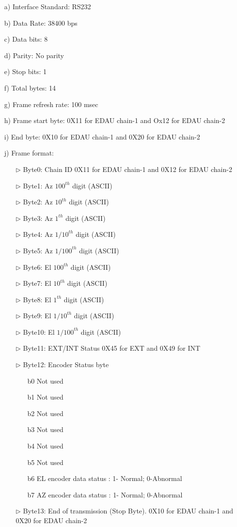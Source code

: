 \begin{enumerate}
	\item [a)] Interface Standard: RS232
	\item [b)] Data Rate:   38400 bps
	\item [c)] Data bits: 8
	\item [d)] Parity: No parity
	\item [e)] Stop bits: 1
	\item [f)] Total bytes: 14
	\item [g)] Frame refresh rate: 100 msec
	\item [h)] Frame start byte: 0X11 for EDAU chain-1 and Ox12 for EDAU chain-2
	\item [i)] End byte: 0X10 for EDAU chain-1 and 0X20 for EDAU chain-2
	\item [j)] Frame format: 
	\begin{enumerate}
		\item [$\rhd$] Byte0: Chain ID 0X11 for EDAU chain-1 and 0X12 for EDAU chain-2
		\item [$\rhd$] Byte1: Az ${100}^{th}$ digit (ASCII)
		\item [$\rhd$] Byte2: Az ${10}^{th}$ digit (ASCII)
		\item [$\rhd$] Byte3: Az ${1}^{th}$ digit (ASCII)
		\item [$\rhd$] Byte4: Az ${1/10}^{th}$ digit (ASCII)
		\item [$\rhd$] Byte5: Az ${1/100}^{th}$ digit (ASCII)
		\item [$\rhd$] Byte6: El ${100}^{th}$ digit (ASCII)
		\item [$\rhd$] Byte7: El ${10}^{th}$ digit (ASCII)
		\item [$\rhd$] Byte8: El ${1}^{th}$ digit (ASCII)
		\item [$\rhd$] Byte9: El ${1/10}^{th}$ digit (ASCII)
		\item [$\rhd$] Byte10: El ${1/100}^{th}$ digit (ASCII)
		\item [$\rhd$] Byte11: EXT/INT Status  0X45 for EXT and 0X49 for INT
		\item [$\rhd$] Byte12: Encoder Status byte
		\begin{enumerate}
			\item [b0] Not used
			\item [b1] Not used
			\item [b2] Not used
			\item [b3] Not used
			\item [b4] Not used
			\item [b5] Not used
			\item [b6] EL encoder data status : 1- Normal; 0-Abnormal
			\item [b7] AZ encoder data status : 1- Normal; 0-Abnormal
		\end{enumerate}
		\item [$\rhd$] Byte13: End of transmission (Stop Byte). 0X10 for EDAU chain-1 and 0X20 for EDAU chain-2
	\end{enumerate}
\end{enumerate}
